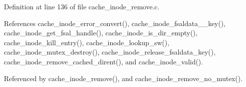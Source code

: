 Definition at line 136 of file cache\_\-inode\_\-remove.c.

References cache\_\-inode\_\-error\_\-convert(), cache\_\-inode\_\-fsaldata\_\_\-key(), cache\_\-inode\_\-get\_\-fsal\_\-handle(), cache\_\-inode\_\-is\_\-dir\_\-empty(), cache\_\-inode\_\-kill\_\-entry(), cache\_\-inode\_\-lookup\_\-sw(), cache\_\-inode\_\-mutex\_\-destroy(), cache\_\-inode\_\-release\_\-fsaldata\_\-key(), cache\_\-inode\_\-remove\_\-cached\_\-dirent(), and cache\_\-inode\_\-valid().

Referenced by cache\_\-inode\_\-remove(), and cache\_\-inode\_\-remove\_\-no\_\-mutex().